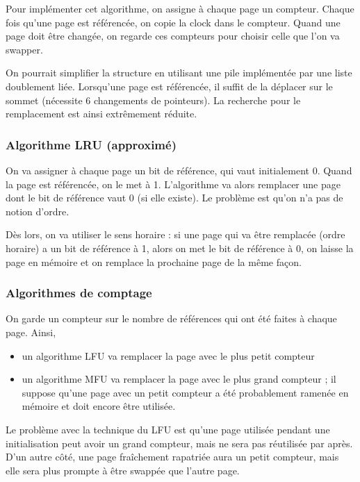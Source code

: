 		
		Pour implémenter cet algorithme, on assigne à chaque page un compteur. Chaque fois qu'une page est référencée, on copie la clock dans le compteur. Quand une page doit être changée, on regarde ces compteurs pour choisir celle que l'on va swapper.
		
		On pourrait simplifier la structure en utilisant une pile implémentée par une liste doublement liée. Lorsqu'une page est référencée, il suffit de la déplacer sur le sommet (nécessite 6 changements de pointeurs). La recherche pour le remplacement est ainsi extrêmement réduite.
		
		
		\subsubsection{Algorithme LRU (approximé)}
		
		On va assigner à chaque page un bit de référence, qui vaut initialement 0. Quand la page est référencée, on le met à 1. L'algorithme va alors remplacer une page dont le bit de référence vaut 0 (si elle existe). Le problème est qu'on n'a pas de notion d'ordre.
		
		Dès lors, on va utiliser le sens horaire : si une page qui va être remplacée (ordre horaire) a un bit de référence à 1, alors on met le bit de référence à 0, on laisse la page en mémoire et on remplace la prochaine page de la même façon.
		
		
		
		\subsubsection{Algorithmes de comptage}
		
		On garde un compteur sur le nombre de références qui ont été faites à chaque page. Ainsi,
		
		\begin{itemize}
			\item un algorithme LFU va remplacer la page avec le plus petit compteur
			\item un algorithme MFU va remplacer la page avec le plus grand compteur ; il suppose qu'une page avec un petit compteur a été probablement ramenée en mémoire et doit encore être utilisée.
		\end{itemize}
		
		Le problème avec la technique du LFU est qu'une page utilisée pendant une initialisation peut avoir un grand compteur, mais ne sera pas réutilisée par après. D'un autre côté, une page fraîchement rapatriée aura un petit compteur, mais elle sera plus prompte à être swappée que l'autre page.
		
